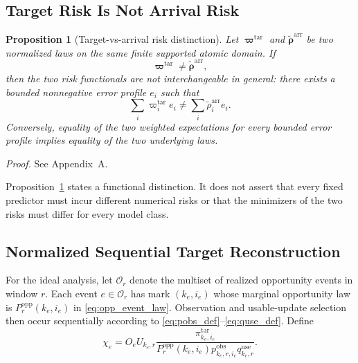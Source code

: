 \documentclass[letterpaper,journal]{IEEEtran}
\newtheorem{proposition}{Proposition}
\begin{document}
\subsection{Target Risk Is Not Arrival Risk}
\label{subsec:prop_risk}

\begin{proposition}[Target-vs-arrival risk distinction]
\label{prop:risk}
Let $\boldsymbol\varpi^{\mathrm{tar}}$ and
$\widetilde{\boldsymbol\rho}^{\mathrm{arr}}$ be two normalized laws on the same
finite supported atomic domain.  If
\begin{equation}
    \boldsymbol\varpi^{\mathrm{tar}}
    \neq
    \widetilde{\boldsymbol\rho}^{\mathrm{arr}},
    \label{eq:dist_not_equal}
\end{equation}
then the two risk functionals are not interchangeable in general: there exists
a bounded nonnegative error profile $e_i$ such that
\begin{equation}
 \sum_i
 \varpi_i^{\mathrm{tar}}e_i
 \neq
 \sum_i
 \widetilde\rho_i^{\mathrm{arr}}e_i.
 \label{eq:prop1_nonidentity}
\end{equation}
Conversely, equality of the two weighted expectations for every bounded error
profile implies equality of the two underlying laws.
\end{proposition}

\noindent\emph{Proof.}
See Appendix~A.

Proposition~\ref{prop:risk} states a functional distinction.  It does not assert that every
fixed predictor must incur different numerical risks or that the minimizers of
the two risks must differ for every model class.

\subsection{Normalized Sequential Target Reconstruction}
\label{subsec:prop_reconstruction}

For the ideal analysis, let $\mathcal{O}_r$ denote the multiset of realized
opportunity events in window $r$.  Each event $e\in\mathcal{O}_r$ has mark
$(k_e,i_e)$ whose marginal opportunity law is
$P_r^{\mathrm{opp}}(k_e,i_e)$ in \eqref{eq:opp_event_law}.  Observation and
usable-update selection then occur sequentially according to
\eqref{eq:pobs_def}--\eqref{eq:quse_def}.  Define
\begin{equation}
 \chi_e
 =
 O_e U_{k_e,r}
 \frac{
 \pi^{\mathrm{tar}}_{k_e,i_e}
 }{
 P_r^{\mathrm{opp}}(k_e,i_e)
 p^{\mathrm{obs}}_{k_e,r,i_e}
 q^{\mathrm{use}}_{k_e,r}
 }.
 \label{eq:chi_event}
\end{equation}
\end{document}

